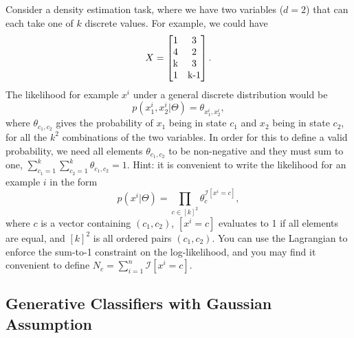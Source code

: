 \documentclass{article}
\begin{document}
Consider a density estimation task, where we have two variables ($d=2$) that can each take one of $k$ discrete values. For example, we could have
\[
X = \mat{1 & 3\\4 & 2\\$k$ & 3\\1 & $k-1$}.
\]
The likelihood for example $x^i$ under a general discrete distribution would be
\[
p(x^i_1, x^i_2 | \Theta) = \theta_{x_1^i,x_2^i},
\]
where $\theta_{c_1,c_2}$ gives the probability of $x_1$ being in state $c_1$ and $x_2$ being in state $c_2$, for all the $k^2$ combinations of the two variables. In order for this to define a valid probability, we need all elements $\theta_{c_1,c_2}$ to be non-negative and they must sum to one, $\sum_{c_1=1}^k\sum_{c_2=1}^k \theta_{c_1,c_2} = 1$.
Hint: it is convenient to write the likelihood for an example $i$ in the form
\[
p(x^i | \Theta) = \prod_{c \in [k]^2}\theta_c^{\mathcal{I}[x^i = c]},
\]
where $c$ is a vector containing $(c_1,c_2)$, $[x^i = c]$ evaluates to 1 if all elements are equal, and $[k]^2$ is all ordered pairs $(c_1,c_2)$. You can use the Lagrangian to enforce the sum-to-1 constraint on the log-likelihood, and you may find it convenient to define $N_c = \sum_{i=1}^n \mathcal{I}[x^i = c]$.


\subsection{Generative Classifiers with Gaussian Assumption}
\end{document}
